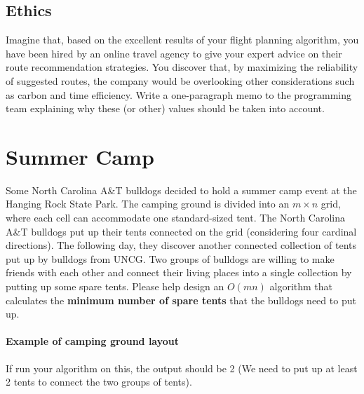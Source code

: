 \documentclass [12pt]{article}
\begin{document}
\subsection {Ethics } Imagine that, based on the excellent results of your flight planning algorithm, you have been hired by an online travel agency to give your expert advice on their route recommendation strategies. You discover that, by maximizing the reliability of suggested routes, the company would be overlooking other considerations such as carbon and time efficiency. Write a one-paragraph memo to the programming team explaining why these (or other) values should be taken into account.  



\pagebreak
\section{Summer Camp} 
Some North Carolina A\&T bulldogs decided to hold a summer camp event at the Hanging Rock State Park. The camping ground is divided into an $m \times n$ grid, where each cell can accommodate one standard-sized tent. The North Carolina A\&T bulldogs put up their tents connected on the grid (considering four cardinal directions). The following day, they discover another connected collection of tents put up by bulldogs from UNCG. Two groups of bulldogs are willing to make friends with each other and connect their living places into a single collection by putting up some spare tents. Please help design an $O(mn)$ algorithm that calculates the \textbf{minimum number of spare tents} that the bulldogs need to put up.

\paragraph {Example of camping ground layout} 

If run your algorithm on this, the output should be 2 (We need to put up at least 2 tents to connect the two groups of tents). 
\end{document}
